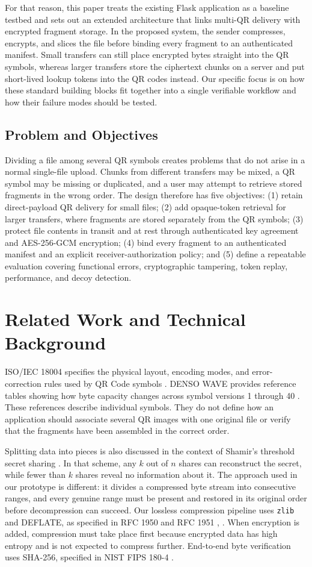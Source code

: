 \documentclass[conference]{IEEEtran}
\begin{document}
For that reason, this paper treats the existing Flask application as a baseline testbed and sets out an extended architecture that links multi-QR delivery with encrypted fragment storage. In the proposed system, the sender compresses, encrypts, and slices the file before binding every fragment to an authenticated manifest. Small transfers can still place encrypted bytes straight into the QR symbols, whereas larger transfers store the ciphertext chunks on a server and put short-lived lookup tokens into the QR codes instead. Our specific focus is on how these standard building blocks fit together into a single verifiable workflow and how their failure modes should be tested.

\subsection{Problem and Objectives}
Dividing a file among several QR symbols creates problems that do not arise in a normal single-file upload. Chunks from different transfers may be mixed, a QR symbol may be missing or duplicated, and a user may attempt to retrieve stored fragments in the wrong order. The design therefore has five objectives: (1) retain direct-payload QR delivery for small files; (2) add opaque-token retrieval for larger transfers, where fragments are stored separately from the QR symbols; (3) protect file contents in transit and at rest through authenticated key agreement and AES-256-GCM encryption; (4) bind every fragment to an authenticated manifest and an explicit receiver-authorization policy; and (5) define a repeatable evaluation covering functional errors, cryptographic tampering, token replay, performance, and decoy detection.

\section{Related Work and Technical Background}
ISO/IEC 18004 specifies the physical layout, encoding modes, and error-correction rules used by QR Code symbols \cite{iso18004}. DENSO WAVE provides reference tables showing how byte capacity changes across symbol versions 1 through 40 \cite{denso}. These references describe individual symbols. They do not define how an application should associate several QR images with one original file or verify that the fragments have been assembled in the correct order.

Splitting data into pieces is also discussed in the context of Shamir's threshold secret sharing \cite{shamir}. In that scheme, any $k$ out of $n$ shares can reconstruct the secret, while fewer than $k$ shares reveal no information about it. The approach used in our prototype is different: it divides a compressed byte stream into consecutive ranges, and every genuine range must be present and restored in its original order before decompression can succeed. Our lossless compression pipeline uses \texttt{zlib} and DEFLATE, as specified in RFC 1950 and RFC 1951 \cite{rfc1950}, \cite{rfc1951}. When encryption is added, compression must take place first because encrypted data has high entropy and is not expected to compress further. End-to-end byte verification uses SHA-256, specified in NIST FIPS 180-4 \cite{fips180}.
\end{document}
